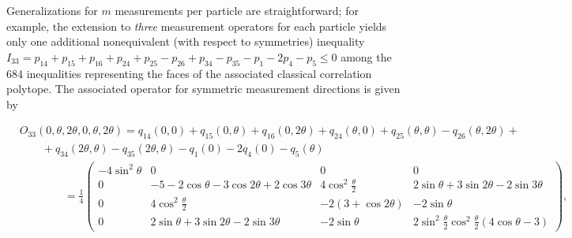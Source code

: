 \documentclass[prl,showpacs,showkeys,amsfonts,amsmath,twocolumn]{revtex4}
\begin{document}
Generalizations for $m$ measurements per particle are
straightforward;
for example, the extension to \emph{three} measurement operators for each particle
yields only one additional nonequivalent (with respect to symmetries)
inequality \cite{collins-gisin-2003,sliwa-2003}
$I_{33}=p_{14} + p_{15} + p_{16} + p_{24} + p_{25} - p_{26} + p_{34} - p_{35}
- p_{1} - 2 p_{4} - p_{5} \leq 0$ among the 684 inequalities \cite{2000-poly} representing the
 faces of the associated classical correlation polytope.
The associated operator for symmetric
measurement directions is given by
\begin{widetext}
\begin{equation}
\begin{array}{lll}
&O_{33}(0,\theta,2\theta,0,\theta,2\theta)= q_{14}(0,0) + q_{15}(0,\theta) + q_{16}(0,2\theta) + q_{24}(\theta,0) +
q_{25}(\theta,\theta) - q_{26}(\theta,2\theta) +\\
&\qquad  + q_{34}(2\theta,\theta)- q_{35}(2\theta,\theta)-q_{1}(0) - 2 q_{4}(0) - q_{5}(\theta) \\
&\qquad \qquad =\frac{1}{4}\left(
\begin{smallmatrix}
-4\sin^2\theta & 0 & 0 & 0\\
0 & -5-2\cos\theta - 3\cos 2\theta + 2\cos 3\theta &
4\cos^2\frac{\theta}{2} & 2\sin\theta + 3 \sin 2\theta - 2 \sin
3\theta\\
0 & 4\cos^2\frac{\theta}{2} & -2(3+\cos 2\theta) & - 2\sin\theta \\
0 &  2\sin\theta + 3 \sin 2\theta - 2 \sin 3\theta & - 2\sin\theta &
2\sin^2\frac{\theta}{2}\cos^2\frac{\theta}{2}(4\cos\theta -3)
\end{smallmatrix}\right),
\end{array}
\label{2004-qbounds-e5}
\end{equation}
\end{widetext}
\end{document}
